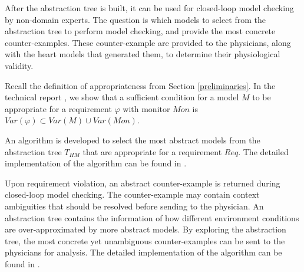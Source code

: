 After the abstraction tree is built, it can be used for closed-loop model checking by non-domain experts. 
The question is which models to select from the abstraction tree to perform model checking, and provide the most concrete counter-examples.
These counter-example are provided to the physicians, along with the heart models that generated them, to determine their physiological validity.

Recall the definition of appropriateness from Section \ref{preliminaries}.
In the technical report \cite{regar_tech}, we show that a sufficient condition for a model $M$ to be appropriate for a requirement $\varphi$ with monitor $Mon$ is
$Var(\varphi) \subset Var(M) \cup Var(Mon)$.

An algorithm is developed to select the most abstract models from the abstraction tree $T_{HM}$ that are appropriate for a requirement $Req$. The detailed implementation of the algorithm can be found in \cite{regar_tech}.

Upon requirement violation, an abstract counter-example is returned during closed-loop model checking. The counter-example may contain context ambiguities that should be resolved before sending to the physician. An abstraction tree contains the information of how different environment conditions are over-approximated by more abstract models. By exploring the abstraction tree, the most concrete yet unambiguous counter-examples can be sent to the physicians for analysis. The detailed implementation of the algorithm can be found in \cite{regar_tech}.%

